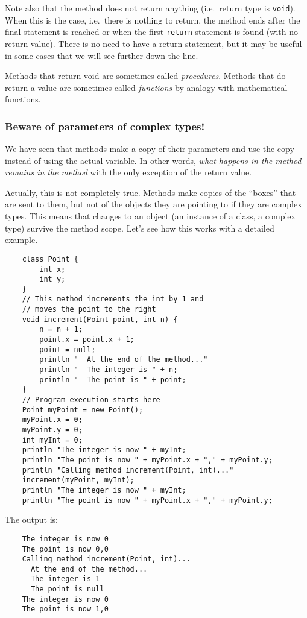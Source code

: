 Note also that the method does not return anything (i.e.~return type
is \verb+void+). When this is the case, 
i.e.~there is nothing to return, the method
ends after the final statement is reached or when the first \verb+return+
statement is found (with no return value). There is no need to have a return
statement, but it may be useful in some cases that we will see further
down the line. 

Methods that return void are sometimes called
\emph{procedures}. Methods that do return a value are sometimes called
\emph{functions} by analogy with mathematical functions.

\subsubsection{Beware of parameters of complex types!}
\label{beware}

We have seen that methods make a copy of their
parameters and use the copy instead of using the actual variable. In
other words, \emph{what happens in the method remains in the method}
with the only exception of the return value. 

Actually, this is not completely true. Methods make copies of the
``boxes'' that are sent to them, but not of the objects they are
pointing to if they are complex types. This means that changes to an
object (an instance of a class, a complex type) 
survive the method scope. Let's see how this works with a
detailed example. 

\begin{verbatim}
    class Point {
        int x;
        int y;
    }
    // This method increments the int by 1 and 
    // moves the point to the right
    void increment(Point point, int n) {
        n = n + 1;
        point.x = point.x + 1;
        point = null;
        println "  At the end of the method..."
        println "  The integer is " + n;
        println "  The point is " + point;
    }
    // Program execution starts here
    Point myPoint = new Point();
    myPoint.x = 0;
    myPoint.y = 0;
    int myInt = 0;
    println "The integer is now " + myInt;
    println "The point is now " + myPoint.x + "," + myPoint.y;
    println "Calling method increment(Point, int)..."
    increment(myPoint, myInt);
    println "The integer is now " + myInt;
    println "The point is now " + myPoint.x + "," + myPoint.y;
\end{verbatim}

The output is: 

\begin{verbatim}
    The integer is now 0
    The point is now 0,0
    Calling method increment(Point, int)...
      At the end of the method...
      The integer is 1
      The point is null
    The integer is now 0
    The point is now 1,0
\end{verbatim}

